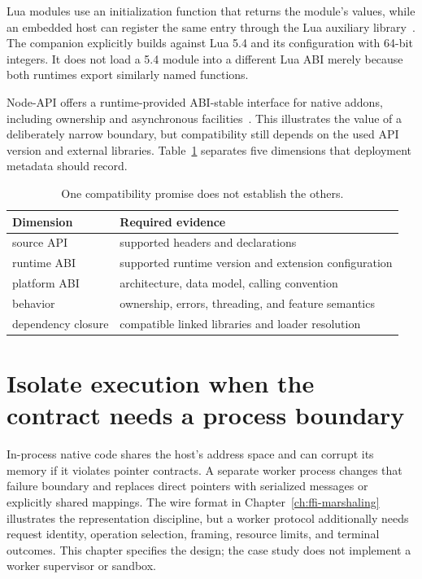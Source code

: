 Lua modules use an initialization function that returns the module's values, while an embedded host can register the same entry through the Lua auxiliary library~\cite{ierusalimschy-2026-lua}.
The companion explicitly builds against Lua 5.4 and its configuration with 64-bit integers.
It does not load a 5.4 module into a different Lua ABI merely because both runtimes export similarly named functions.

Node-API offers a runtime-provided ABI-stable interface for native addons, including ownership and asynchronous facilities~\cite{node-2026-api}.
This illustrates the value of a deliberately narrow boundary, but compatibility still depends on the used API version and external libraries.
Table~\ref{tab:ch75-compatibility} separates five dimensions that deployment metadata should record.

\begin{table}[htbp]
\caption{One compatibility promise does not establish the others.}
\label{tab:ch75-compatibility}
\centering
\begin{tabular}{ll}
\toprule
Dimension & Required evidence \\
\midrule
source API & supported headers and declarations \\
runtime ABI & supported runtime version and extension configuration \\
platform ABI & architecture, data model, calling convention \\
behavior & ownership, errors, threading, and feature semantics \\
dependency closure & compatible linked libraries and loader resolution \\
\bottomrule
\end{tabular}
\end{table}

\section{Isolate execution when the contract needs a process boundary}
\label{sec:ch75-isolation}
In-process native code shares the host's address space and can corrupt its memory if it violates pointer contracts.
A separate worker process changes that failure boundary and replaces direct pointers with serialized messages or explicitly shared mappings.
The wire format in Chapter~\ref{ch:ffi-marshaling} illustrates the representation discipline, but a worker protocol additionally needs request identity, operation selection, framing, resource limits, and terminal outcomes.
This chapter specifies the design; the case study does not implement a worker supervisor or sandbox.

